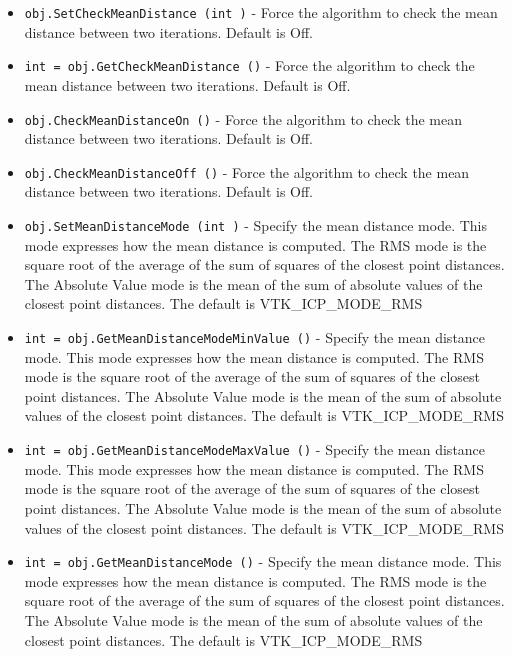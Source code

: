\begin{itemize}
\item  \verb|obj.SetCheckMeanDistance (int )| -  Force the algorithm to check the mean distance between two iterations.
 Default is Off.

\item  \verb|int = obj.GetCheckMeanDistance ()| -  Force the algorithm to check the mean distance between two iterations.
 Default is Off.

\item  \verb|obj.CheckMeanDistanceOn ()| -  Force the algorithm to check the mean distance between two iterations.
 Default is Off.

\item  \verb|obj.CheckMeanDistanceOff ()| -  Force the algorithm to check the mean distance between two iterations.
 Default is Off.

\item  \verb|obj.SetMeanDistanceMode (int )| -  Specify the mean distance mode. This mode expresses how the mean 
 distance is computed. The RMS mode is the square root of the average
 of the sum of squares of the closest point distances. The Absolute
 Value mode is the mean of the sum of absolute values of the closest
 point distances. The default is VTK\_ICP\_MODE\_RMS

\item  \verb|int = obj.GetMeanDistanceModeMinValue ()| -  Specify the mean distance mode. This mode expresses how the mean 
 distance is computed. The RMS mode is the square root of the average
 of the sum of squares of the closest point distances. The Absolute
 Value mode is the mean of the sum of absolute values of the closest
 point distances. The default is VTK\_ICP\_MODE\_RMS

\item  \verb|int = obj.GetMeanDistanceModeMaxValue ()| -  Specify the mean distance mode. This mode expresses how the mean 
 distance is computed. The RMS mode is the square root of the average
 of the sum of squares of the closest point distances. The Absolute
 Value mode is the mean of the sum of absolute values of the closest
 point distances. The default is VTK\_ICP\_MODE\_RMS

\item  \verb|int = obj.GetMeanDistanceMode ()| -  Specify the mean distance mode. This mode expresses how the mean 
 distance is computed. The RMS mode is the square root of the average
 of the sum of squares of the closest point distances. The Absolute
 Value mode is the mean of the sum of absolute values of the closest
 point distances. The default is VTK\_ICP\_MODE\_RMS


\end{itemize}
